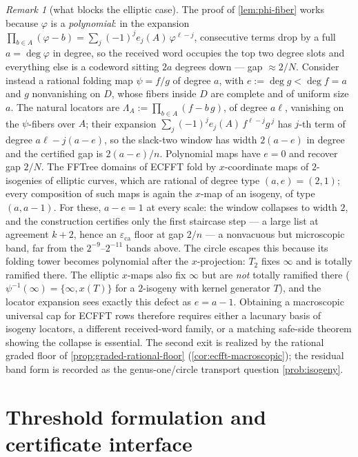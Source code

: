 \documentclass[11pt]{article}
\theoremstyle{definition}
\theoremstyle{remark}
\newtheorem{remark}[remark]{Remark}
\newcommand{\eca}{\varepsilon_{\mathrm{ca}}}
\begin{document}
\begin{remark}[what blocks the elliptic case]\label{rem:ecfft-obstruction}
The proof of \cref{lem:phi-fiber} works because $\varphi$ is a \emph{polynomial}: in the expansion $\prod_{b\in A}(\varphi-b)=\sum_j(-1)^je_j(A)\,\varphi^{\ell-j}$, consecutive terms drop by a full $a=\deg\varphi$ in degree, so the received word occupies the top two degree slots and everything else is a codeword sitting $2a$ degrees down --- gap $\approx2/N$. Consider instead a rational folding map $\psi=f/g$ of degree $a$, with $e:=\deg g<\deg f=a$ and $g$ nonvanishing on $D$, whose fibers inside $D$ are complete and of uniform size $a$. The natural locators are $\Lambda_A:=\prod_{b\in A}(f-b\,g)$, of degree $a\ell$, vanishing on the $\psi$-fibers over $A$; their expansion $\sum_j(-1)^je_j(A)\,f^{\ell-j}g^{\,j}$ has $j$-th term of degree $a\ell-j(a-e)$, so the slack-two window has width $2(a-e)$ in degree and the certified gap is $2(a-e)/n$. Polynomial maps have $e=0$ and recover gap $2/N$. The FFTree domains of ECFFT \cite{BCKL21} fold by $x$-coordinate maps of $2$-isogenies of elliptic curves, which are rational of degree type $(a,e)=(2,1)$; every composition of such maps is again the $x$-map of an isogeny, of type $(a,a-1)$. For these, $a-e=1$ at every scale: the window collapses to width $2$, and the construction certifies only the first staircase step --- a large list at agreement $k+2$, hence an $\eca$ floor at gap $2/n$ --- a nonvacuous but microscopic band, far from the $2^{-9}$--$2^{-11}$ bands above. The circle escapes this because its folding tower becomes polynomial after the $x$-projection: $T_2$ fixes $\infty$ and is totally ramified there. The elliptic $x$-maps also fix $\infty$ but are \emph{not} totally ramified there ($\psi^{-1}(\infty)=\{\infty,x(T)\}$ for a $2$-isogeny with kernel generator $T$), and the locator expansion sees exactly this defect as $e=a-1$. Obtaining a macroscopic universal cap for ECFFT rows therefore requires either a lacunary basis of isogeny locators, a different received-word family, or a matching safe-side theorem showing the collapse is essential. The second exit is realized by the rational graded floor of \cref{prop:graded-rational-floor} \textup(\cref{cor:ecfft-macroscopic}\textup); the residual band form is recorded as the genus-one/circle transport question \cref{prob:isogeny}.
\end{remark}


\section{Threshold formulation and certificate interface}\label{sec:prize-program}
\end{document}
